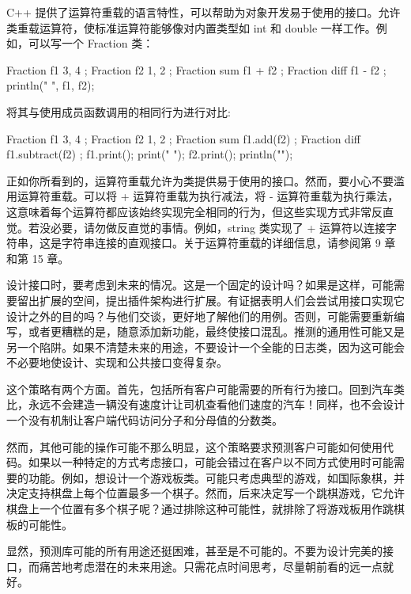 C++ 提供了运算符重载的语言特性，可以帮助为对象开发易于使用的接口。允许类重载运算符，使标准运算符能够像对内置类型如 int 和 double 一样工作。例如，可以写一个 Fraction 类：

\begin{cpp}
Fraction f1 { 3, 4 };
Fraction f2 { 1, 2 };
Fraction sum { f1 + f2 };
Fraction diff { f1 - f2 };
println("{} {}", f1, f2);
\end{cpp}

将其与使用成员函数调用的相同行为进行对比:

\begin{cpp}
Fraction f1 { 3, 4 };
Fraction f2 { 1, 2 };
Fraction sum { f1.add(f2) };
Fraction diff { f1.subtract(f2) };
f1.print();
print(" ");
f2.print();
println("");
\end{cpp}

正如你所看到的，运算符重载允许为类提供易于使用的接口。然而，要小心不要滥用运算符重载。可以将 + 运算符重载为执行减法，将 - 运算符重载为执行乘法，这意味着每个运算符都应该始终实现完全相同的行为，但这些实现方式非常反直觉。若没必要，请勿做反直觉的事情。例如，string 类实现了 + 运算符以连接字符串，这是字符串连接的直观接口。关于运算符重载的详细信息，请参阅第 9 章和第 15 章。


设计接口时，要考虑到未来的情况。这是一个固定的设计吗？如果是这样，可能需要留出扩展的空间，提出插件架构进行扩展。有证据表明人们会尝试用接口实现它设计之外的目的吗？与他们交谈，更好地了解他们的用例。否则，可能需要重新编写，或者更糟糕的是，随意添加新功能，最终使接口混乱。推测的通用性可能又是另一个陷阱。如果不清楚未来的用途，不要设计一个全能的日志类，因为这可能会不必要地使设计、实现和公共接口变得复杂。

这个策略有两个方面。首先，包括所有客户可能需要的所有行为接口。回到汽车类比，永远不会建造一辆没有速度计让司机查看他们速度的汽车！同样，也不会设计一个没有机制让客户端代码访问分子和分母值的分数类。

然而，其他可能的操作可能不那么明显，这个策略要求预测客户可能如何使用代码。如果以一种特定的方式考虑接口，可能会错过在客户以不同方式使用时可能需要的功能。例如，想设计一个游戏板类。可能只考虑典型的游戏，如国际象棋，并决定支持棋盘上每个位置最多一个棋子。然而，后来决定写一个跳棋游戏，它允许棋盘上一个位置有多个棋子呢？通过排除这种可能性，就排除了将游戏板用作跳棋板的可能性。

显然，预测库可能的所有用途还挺困难，甚至是不可能的。不要为设计完美的接口，而痛苦地考虑潜在的未来用途。只需花点时间思考，尽量朝前看的远一点就好。

